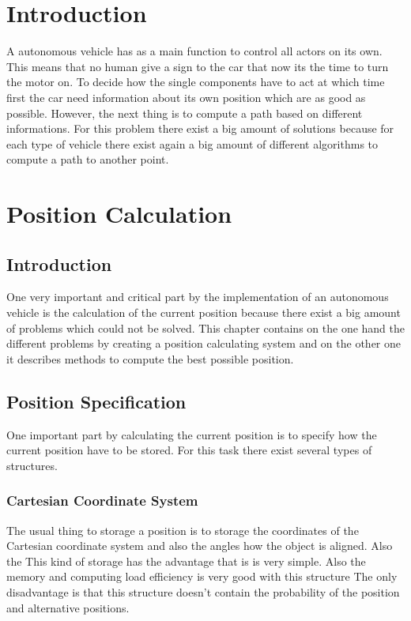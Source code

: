 \section{Introduction}
A autonomous vehicle has as a main function to control all actors on its own.
This means that no human give a sign to the car that now its the time to turn the motor on.
To decide how the single components have to act at which time first the car need information about its own position which are as good as possible.
However, the next thing is to compute a path based on different informations.
For this problem there exist a big amount of solutions because for each type of vehicle there exist again a big amount of different algorithms to compute a path to another point.


\section{Position Calculation}


\subsection{Introduction}
One very important and critical part by the implementation of an autonomous vehicle is the calculation of the current position because there exist a big amount of problems which could not be solved.
This chapter contains on the one hand the different problems by creating a position calculating system and on the other one it describes methods to compute the best possible position.


\subsection{Position Specification}
One important part by calculating the current position is to specify how the current position have to be stored.
For this task there exist several types of structures.


\subsubsection{Cartesian Coordinate System}
The usual thing to storage a position is to storage the coordinates of the Cartesian coordinate system and also the angles how the object is aligned.
Also the 
This kind of storage has the advantage that is is very simple.
Also the memory and computing load efficiency is very good with this structure
The only disadvantage is that this structure doesn't contain the probability of the position and alternative positions.


